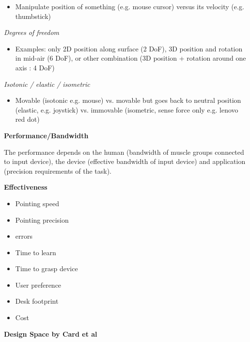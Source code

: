 \begin{itemize}[itemsep=-5pt, topsep=0pt, leftmargin=*]
	\item Manipulate position of something (e.g. mouse cursor) versus its velocity (e.g. thumbstick)
\end{itemize} \medskip

\textit{Degrees of freedom} \smallskip

\begin{itemize}[itemsep=-5pt, topsep=0pt, leftmargin=*]
	\item Examples: only 2D position along surface (2 DoF), 3D position and rotation in mid-air (6 DoF), or other combination (3D position + rotation around one axis : 4 DoF)
\end{itemize} \medskip

\textit{Isotonic / elastic / isometric} \smallskip

\begin{itemize}[itemsep=-5pt, topsep=0pt, leftmargin=*]
	\item Movable (isotonic e.g. mouse) vs. movable but goes back to neutral position (elastic, e.g. joystick) vs. immovable (isometric, sense force only e.g. lenovo red dot)
\end{itemize} \medskip

\textbf{Performance/Bandwidth} \smallskip

The performance depends on the human (bandwidth of muscle groups connected to input device), the device (effective bandwidth of input device) 
and application (precision requirements of the task). \medskip

\textbf{Effectiveness}

\begin{multicols}{2}
    \begin{itemize}[itemsep=-5pt, topsep=0pt, leftmargin=*]
	\item Pointing speed
	\item Pointing precision
	\item errors
	\item Time to learn
	\item Time to grasp device
	\item User preference
	\item Desk footprint
	\item Cost
	\end{itemize}
\end{multicols}


\textbf{Design Space by Card et al} \smallskip

